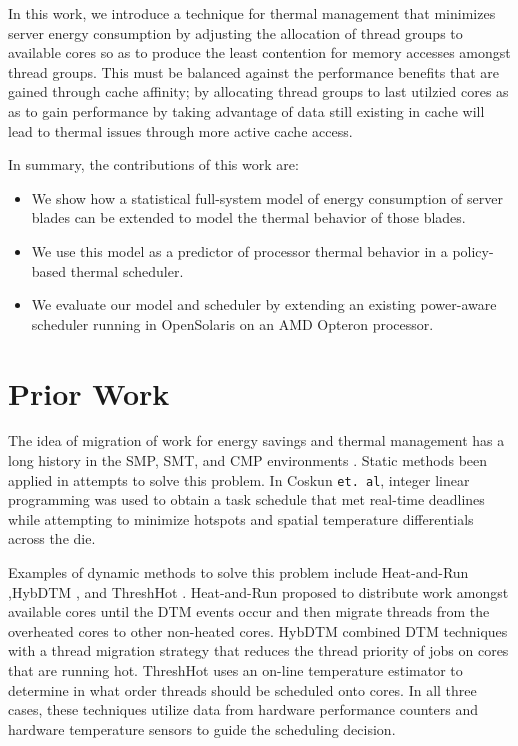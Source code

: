 \documentclass[acmtaco]{acmtrans2m}
\begin{document}
In this work, we introduce a technique for thermal management that
minimizes server energy consumption by adjusting the allocation of
thread groups to available cores so as to produce the least contention
for memory accesses amongst thread groups.  This must be balanced
against the performance benefits that are gained through cache affinity;
by allocating thread groups to last utilzied cores as as to gain
performance by taking advantage of data still existing in cache will
lead to thermal issues through more active cache access.

In summary, the contributions of this work are:
\begin{itemize}
\item We show how a statistical full-system model of energy
  consumption of server blades can be extended to model the thermal
  behavior of those blades.
\item We use this model as a predictor of processor
  thermal behavior in a policy-based thermal scheduler.
\item We evaluate our model and scheduler by extending an existing
  power-aware scheduler running in OpenSolaris on an AMD Opteron
  processor.
\end{itemize}
\section{Prior Work}
\label{sec:related}
The idea of migration of work for energy savings and thermal management
has a long history in the SMP, SMT, and CMP environments
\cite{Yao1995}. Static methods been applied in attempts to solve this
problem.  In Coskun \texttt{et. al}\cite{Coskun2008a}, integer linear
programming was used to obtain a task schedule that met real-time
deadlines while attempting to minimize hotspots and spatial temperature
differentials across the die.

Examples of dynamic methods to solve this problem include Heat-and-Run
\cite{Gomaa2004},HybDTM \cite{Kumar2006}, and ThreshHot \cite{Yang2008}.
Heat-and-Run proposed to distribute work amongst available cores until
the DTM events occur and then migrate threads from the overheated cores
to other non-heated cores. HybDTM combined DTM techniques with a thread
migration strategy that reduces the thread priority of jobs on cores
that are running hot. ThreshHot uses an on-line temperature estimator to
determine in what order threads should be scheduled onto cores. In all
three cases, these techniques utilize data from hardware performance
counters and hardware temperature sensors to guide the scheduling
decision.
\end{document}
